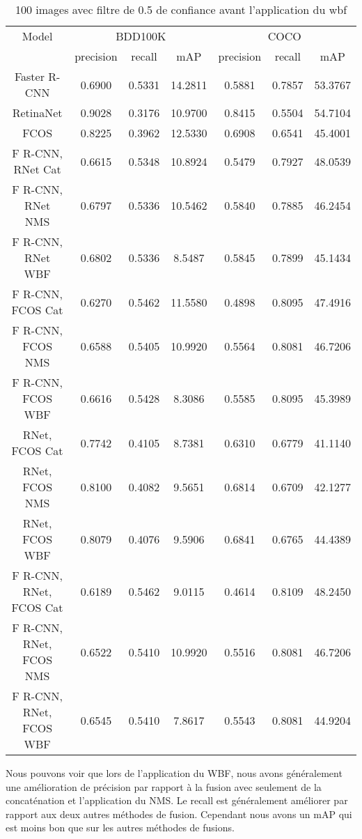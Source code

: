 \documentclass{article}
\begin{document}
\begin{table}[h!]
\centering
\begin{tabular}{|c||c|c|c|c||c|c|} 
\hline
Model & \multicolumn{3}{|c||}{BDD100K} & \multicolumn{3}{|c|}{COCO} \\ 
 & precision & recall & mAP  & precision & recall & mAP  \\ [0.5ex] 
\hline
Faster R-CNN & 0.6900 & 0.5331 & 14.2811 & 0.5881 & 0.7857 & 53.3767 \\ 
\hline
RetinaNet & 0.9028 & 0.3176 & 10.9700 & 0.8415 & 0.5504 & 54.7104 \\ 
\hline
FCOS & 0.8225 & 0.3962 & 12.5330 & 0.6908 & 0.6541 & 45.4001 \\ 
\hline
F R-CNN, RNet Cat & 0.6615 & 0.5348 & 10.8924 & 0.5479 & 0.7927 & 48.0539 \\ 
\hline
F R-CNN, RNet NMS & 0.6797 & 0.5336 & 10.5462 & 0.5840 & 0.7885 & 46.2454 \\ 
\hline
F R-CNN, RNet WBF & 0.6802 & 0.5336 & 8.5487 & 0.5845 & 0.7899 & 45.1434 \\ 
\hline
F R-CNN, FCOS Cat & 0.6270 & 0.5462 & 11.5580 & 0.4898 & 0.8095 & 47.4916 \\ 
\hline
F R-CNN, FCOS NMS & 0.6588 & 0.5405 & 10.9920 & 0.5564 & 0.8081 & 46.7206 \\ 
\hline
F R-CNN, FCOS WBF & 0.6616 & 0.5428 & 8.3086 & 0.5585 & 0.8095 & 45.3989 \\ 
\hline
RNet, FCOS Cat & 0.7742 & 0.4105 & 8.7381 & 0.6310 & 0.6779 & 41.1140 \\ 
\hline
RNet, FCOS NMS & 0.8100 & 0.4082 & 9.5651 & 0.6814 & 0.6709 & 42.1277 \\ 
\hline
RNet, FCOS WBF & 0.8079 & 0.4076 & 9.5906 & 0.6841 & 0.6765 & 44.4389 \\ 
\hline
F R-CNN, RNet, FCOS Cat & 0.6189 & 0.5462 & 9.0115 & 0.4614 & 0.8109 & 48.2450 \\ 
\hline
F R-CNN, RNet, FCOS NMS & 0.6522 & 0.5410 & 10.9920 & 0.5516 & 0.8081 & 46.7206 \\ 
\hline
F R-CNN, RNet, FCOS WBF & 0.6545 & 0.5410 & 7.8617 & 0.5543 & 0.8081 & 44.9204 \\ 
\hline
\end{tabular}
\caption{100 images avec filtre de 0.5 de confiance avant l'application du wbf}
\label{table:data}
\end{table}

Nous pouvons voir que lors de l'application du WBF, nous avons généralement une amélioration de précision par rapport à la fusion avec seulement de la concaténation et l'application du NMS. Le recall est généralement améliorer par rapport aux deux autres méthodes de fusion. Cependant nous avons un mAP qui est moins bon que sur les autres méthodes de fusions. 
\newpage
\end{document}
